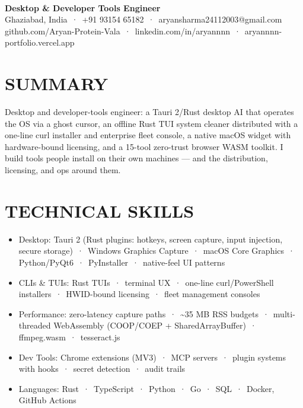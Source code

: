 \documentclass[9pt]{article}
\begin{document}
\\[3pt]
{\large\bfseries Desktop \& Developer Tools Engineer}\\[3pt]
{\small\color{greyc} Ghaziabad, India \,·\, +91 93154 65182 \,·\, aryansharma24112003@gmail.com}\vspace{-2pt}
{\small\color{greyc} github.com/Aryan-Protein-Vala \,·\, linkedin.com/in/aryannnn \,·\, aryannnn-portfolio.vercel.app}\vspace{-2pt}
\section*{SUMMARY}
Desktop and developer-tools engineer: a Tauri 2/Rust desktop AI that operates the OS via a ghost cursor, an offline Rust TUI system cleaner distributed with a one-line curl installer and enterprise fleet console, a native macOS widget with hardware-bound licensing, and a 15-tool zero-trust browser WASM toolkit. I build tools people install on their own machines  ---  and the distribution, licensing, and ops around them.
\vspace{1pt}
\section*{TECHNICAL SKILLS}
\begin{itemize}[leftmargin=11pt,itemsep=0pt,topsep=1pt,parsep=0pt]
\item Desktop: Tauri 2 (Rust plugins: hotkeys, screen capture, input injection, secure storage) \,·\, Windows Graphics Capture \,·\, macOS Core Graphics \,·\, Python/PyQt6 \,·\, PyInstaller \,·\, native-feel UI patterns
\item CLIs \& TUIs: Rust TUIs \,·\, terminal UX \,·\, one-line curl/PowerShell installers \,·\, HWID-bound licensing \,·\, fleet management consoles
\item Performance: zero-latency capture paths \,·\, \textasciitilde{}35 MB RSS budgets \,·\, multi-threaded WebAssembly (COOP/COEP + SharedArrayBuffer) \,·\, ffmpeg.wasm \,·\, tesseract.js
\item Dev Tools: Chrome extensions (MV3) \,·\, MCP servers \,·\, plugin systems with hooks \,·\, secret detection \,·\, audit trails
\item Languages: Rust \,·\, TypeScript \,·\, Python \,·\, Go \,·\, SQL \,·\, Docker, GitHub Actions
\end{itemize}
\end{document}
